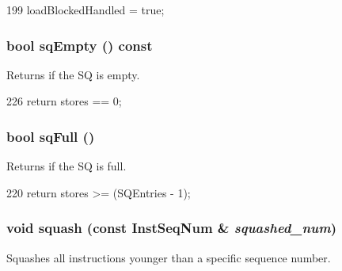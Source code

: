 \begin{DoxyCode}
199     { loadBlockedHandled = true; }
\end{DoxyCode}
\hypertarget{classLSQUnit_a5761e9640bec8ba8474945cce57b6501}{
\subsubsection[{sqEmpty}]{\setlength{\rightskip}{0pt plus 5cm}bool sqEmpty () const}}
\label{classLSQUnit_a5761e9640bec8ba8474945cce57b6501}
Returns if the SQ is empty. 


\begin{DoxyCode}
226 { return stores == 0; }
\end{DoxyCode}
\hypertarget{classLSQUnit_a477981d1f905d2d398a1527f7149e3c4}{
\subsubsection[{sqFull}]{\setlength{\rightskip}{0pt plus 5cm}bool sqFull ()}}
\label{classLSQUnit_a477981d1f905d2d398a1527f7149e3c4}
Returns if the SQ is full. 


\begin{DoxyCode}
220 { return stores >= (SQEntries - 1); }
\end{DoxyCode}
\hypertarget{classLSQUnit_a51dd7e304d5413447717826fac6f4921}{
\subsubsection[{squash}]{\setlength{\rightskip}{0pt plus 5cm}void squash (const {\bf InstSeqNum} \& {\em squashed\_\-num})}}
\label{classLSQUnit_a51dd7e304d5413447717826fac6f4921}
Squashes all instructions younger than a specific sequence number. 


